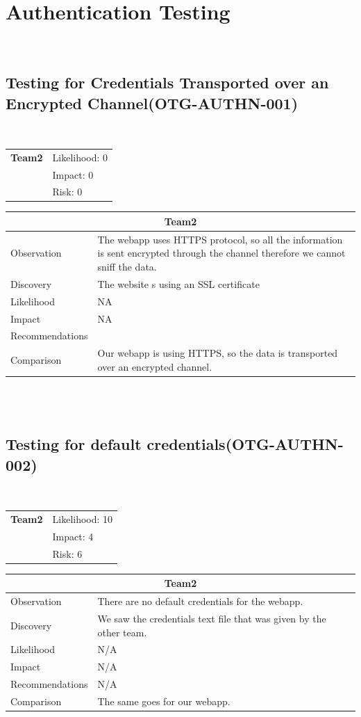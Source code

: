 \documentclass[headsepline,footsepline,footinclude=false,oneside,fontsize=11pt,paper=a4,listof=totoc,bibliography=totoc]{scrbook} %
\begin{document}
\pagebreak

\section{Authentication Testing}\
\subsection{Testing for Credentials Transported over an Encrypted Channel(OTG-AUTHN-001)}\

\begin{tabular}{cR{12cm}}
	\textbf{Team2} & Likelihood: 0\\& Impact: 0\\& Risk: 0
\end{tabular}

\begin{tabular}{ l|p{11cm}  }
	\hline
	\multicolumn{2}{c}{\textbf{Team2}} \\
	\hline
	Observation   & The webapp uses HTTPS protocol, so all the information is sent encrypted through the channel therefore we cannot sniff the data.\\
	Discovery  & The website s using an SSL certificate \\
	Likelihood & NA \\
	Impact    & NA\\
	Recommendations &   \\
	Comparison & Our webapp is using HTTPS, so the data is transported over an encrypted channel.\\
	\hline
\end{tabular}
\\
\vspace{0.5cm}
\\


\pagebreak
\subsection{Testing for default credentials(OTG-AUTHN-002)}\
\begin{tabular}{cR{12cm}}
	\textbf{Team2} & Likelihood: 10\\& Impact: 4\\& Risk: 6
\end{tabular}

\begin{tabular}{ l|p{11cm}  }
	\hline
	\multicolumn{2}{c}{\textbf{Team2}} \\
	\hline
	Observation   & There are no default credentials for the webapp. \\
	Discovery  & We saw the credentials text file that was given by the other team.\\
	Likelihood & N/A \\
	Impact    &  N/A \\
	Recommendations &  N/A\\
	Comparison & The same goes for our webapp.\\
	\hline
\end{tabular}
\pagebreak
\end{document}
